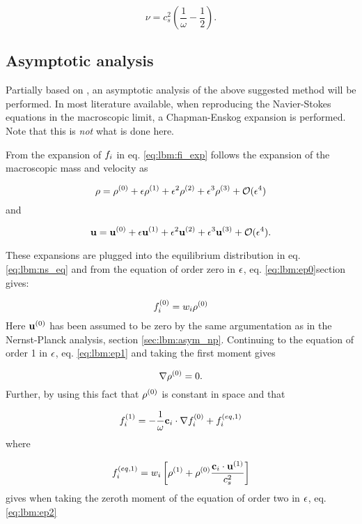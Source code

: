 \begin{equation}\label{eq:lbm:nu}
\nu = c_s^2\left( \frac{1}{\omega} - \frac{1}{2} \right).
\end{equation}

\subsection{Asymptotic analysis}\label{sec:lbm:asym_ns}
Partially based on \cite{junk-asym}, an asymptotic analysis of the
above suggested method will be performed. In most literature
available, when reproducing the Navier-Stokes equations in the
macroscopic limit, a Chapman-Enskog expansion is performed. Note that
this is \emph{not} what is done here.

From the expansion of $f_i$ in eq. \eqref{eq:lbm:fi_exp} follows the
expansion of the macroscopic mass and velocity as

\begin{equation}\label{eq:lbm:ns_rho_exp}
\rho = \rho^{(0)} + \epsilon\rho^{(1)} + \epsilon^2\rho^{(2)} + \epsilon^3\rho^{(3)} +
\mathcal{O}(\epsilon^4)
\end{equation} 
and

\begin{equation}
\mathbf{u} = \mathbf{u}^{(0)} + \epsilon\mathbf{u}^{(1)} + \epsilon^2\mathbf{u}^{(2)} + \epsilon^3\mathbf{u}^{(3)} + \mathcal{O}(\epsilon^4).
\end{equation}

These expansions are plugged into the equilibrium distribution in
eq. \eqref{eq:lbm:ns_eq} and from the equation of order zero in $\epsilon$,
eq. \eqref{eq:lbm:ep0}section gives:

\begin{equation}
  f_i^{(0)} = w_i \rho^{(0)}
\end{equation}
Here $\mathbf{u}^{(0)}$ has been assumed to be zero by the same argumentation as
in the Nernst-Planck analysis, section
\ref{sec:lbm:asym_np}. Continuing to the equation of order 1 in $\epsilon$,
eq. \eqref{eq:lbm:ep1} and taking the first moment gives

\begin{equation}\label{eq:lbm:ns_rhoe0}
\nabla \rho^{(0)} = 0.
\end{equation}
Further, by using this fact that $\rho^{(0)}$ is constant in space and
that

\begin{equation}
f_i^{(1)} = - \frac{1}{\omega} \mathbf{c}_i\cdot\nabla f_i^{(0)} + f_i^{(eq, 1)}
\end{equation}
where

\begin{equation}
f_i^{(eq, 1)} = w_i\left[ \rho^{(1)} + \rho^{(0)}\frac{\mathbf{c}_i \cdot \mathbf{u}^{(1)}}{c_s^2}
  \right]
\end{equation}
gives when taking the zeroth moment of the equation of order two in $\epsilon$,
eq. \eqref{eq:lbm:ep2}

